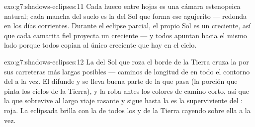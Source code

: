 \begin{solution}{exo:g7:shadows-eclipses:11}
Cada hueco entre hojas es una cámara estenopeica natural; cada mancha
del suelo es la  del Sol que forma ese agujerito --- redonda
en los días corrientes. Durante el eclipse parcial, el propio Sol es
un creciente, así que cada camarita fiel proyecta un
creciente --- y todos apuntan hacia el mismo lado porque todos
copian al único creciente que hay en el cielo.
\end{solution}

\begin{solution}{exo:g7:shadows-eclipses:12}
La  del Sol que roza el borde de la Tierra cruza la
 por sus carreteras más largas posibles --- caminos de
longitud de  en todo el contorno del  a la vez. El
 difunde y se lleva buena parte de la  que pasa (la
porción que pinta los cielos de la Tierra), y la  roba
antes los colores de camino corto, así que la  que sobrevive al
largo viaje rasante y sigue hasta la  es la superviviente del
: roja. La  eclipsada brilla con la  de
todos los  y  de la Tierra cayendo sobre
ella a la vez.
\end{solution}

